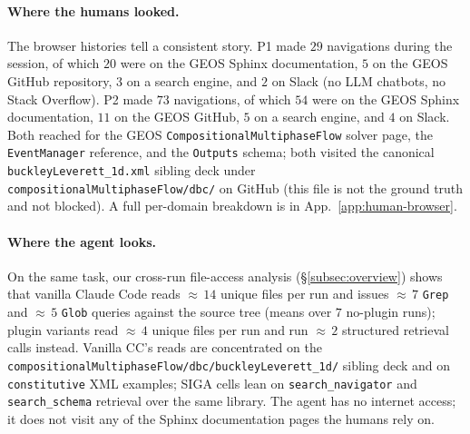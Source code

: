 \documentclass{article}
\begin{document}
\paragraph{Where the humans looked.} The browser histories tell a consistent story. P1 made $29$ navigations during the session, of which $20$ were on the GEOS Sphinx documentation, $5$ on the GEOS GitHub repository, $3$ on a search engine, and $2$ on Slack (no LLM chatbots, no Stack Overflow). P2 made $73$ navigations, of which $54$ were on the GEOS Sphinx documentation, $11$ on the GEOS GitHub, $5$ on a search engine, and $4$ on Slack. Both reached for the GEOS \texttt{CompositionalMultiphaseFlow} solver page, the \texttt{EventManager} reference, and the \texttt{Outputs} schema; both visited the canonical \texttt{buckleyLeverett\_1d.xml} sibling deck under \texttt{compositionalMultiphaseFlow/dbc/} on GitHub (this file is not the ground truth and not blocked). A full per-domain breakdown is in App.~\ref{app:human-browser}.

\paragraph{Where the agent looks.} On the same task, our cross-run file-access analysis (\S\ref{subsec:overview}) shows that vanilla Claude Code reads ${\approx}\,14$ unique files per run and issues ${\approx}\,7$ \texttt{Grep} and ${\approx}\,5$ \texttt{Glob} queries against the source tree (means over $7$ no-plugin runs); plugin variants read ${\approx}\,4$ unique files per run and run ${\approx}\,2$ structured retrieval calls instead. Vanilla CC's reads are concentrated on the \texttt{compositionalMultiphaseFlow/dbc/buckleyLeverett\_1d/} sibling deck and on \texttt{constitutive} XML examples; SIGA cells lean on \texttt{search\_navigator} and \texttt{search\_schema} retrieval over the same library. The agent has no internet access; it does not visit any of the Sphinx documentation pages the humans rely on.
\end{document}
